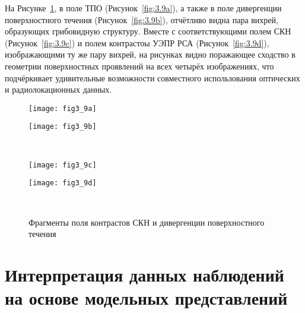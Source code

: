 На Рисунке~\ref{fig:3.9}, в поле ТПО (Рисунок~\ref{fig:3.9a}), а также в поле дивергенции поверхностного течения (Рисунок~\ref{fig:3.9b}), отчётливо видна пара вихрей, образующих грибовидную структуру. Вместе с соответствующими полем СКН (Рисунок~\ref{fig:3.9c}) и полем контрастоы УЭПР РСА (Рисунок~\ref{fig:3.9d}), изображающими ту же пару вихрей, на рисунках видно поражающее сходство в геометрии поверхностных проявлений на всех четырёх изображениях, что подчёркивает удивительные возможности совместного использования оптических и радиолокационных данных.



\begin{figure}[H]
   	\centering
	\begin{minipage}{.47\textwidth}
	    \subcaptionbox{\label{fig:3.9a}}
		{\texttt{[image: fig3\_9a]}}
	\end{minipage}
	\hfill
	\begin{minipage}{.47\textwidth}
	    \subcaptionbox{\label{fig:3.9b}}
		{\texttt{[image: fig3\_9b]}}
	\end{minipage}
	\\
	\begin{minipage}{.47\textwidth}
	    \subcaptionbox{\label{fig:3.9c}}
		{\texttt{[image: fig3\_9c]}}
	\end{minipage}
	\hfill
	\begin{minipage}{.47\textwidth}
	    \subcaptionbox{\label{fig:3.9d}}
		{\texttt{[image: fig3\_9d]}}
	\end{minipage}
    \\
    \caption{Фрагменты поля контрастов СКН и дивергенции поверхностного течения}
    \label{fig:3.9}
\end{figure}



\section{Интерпретация данных наблюдений на основе модельных представлений} \label{sec:3.3}



